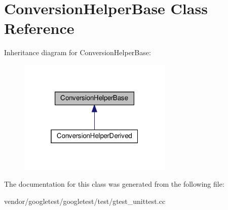 \hypertarget{class_conversion_helper_base}{}\section{Conversion\+Helper\+Base Class Reference}
\label{class_conversion_helper_base}


Inheritance diagram for Conversion\+Helper\+Base\+:
\nopagebreak
\begin{figure}[H]
\begin{center}
\leavevmode
\includegraphics[width=208pt]{class_conversion_helper_base__inherit__graph}
\end{center}
\end{figure}


The documentation for this class was generated from the following file\+:\begin{DoxyCompactItemize}
\item 
vendor/googletest/googletest/test/gtest\+\_\+unittest.\+cc\end{DoxyCompactItemize}
